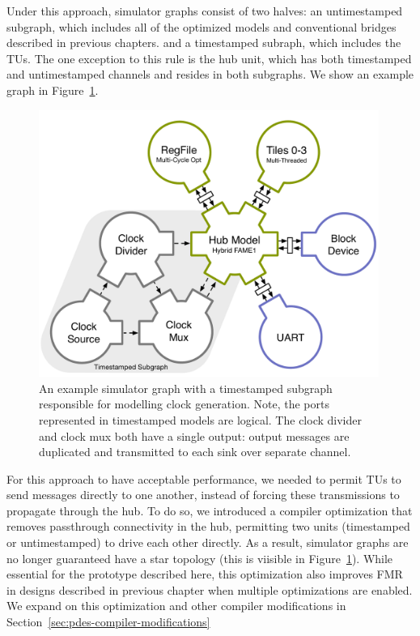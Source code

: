 Under this approach, simulator graphs consist of two halves: an untimestamped
subgraph, which includes all of the optimized models and conventional bridges
described in previous chapters. and a timestamped subraph, which includes the
TUs.  The one exception to this rule is the hub unit, which has both
timestamped and untimestamped  channels and resides in both subgraphs. We show
an example graph in Figure~\ref{fig:gg-graph-pdes}.

\begin{figure}
    \centering
    \includegraphics[width=0.99\textwidth]{figures/gg-graph-pdes.pdf}
    \caption{An example simulator graph with a timestamped subgraph
    responsible for modelling clock generation.  Note, the ports represented in
    timestamped models are logical. The clock divider and clock mux both have a
    single output: output messages are duplicated and transmitted to each sink
    over separate channel.}
    \label{fig:gg-graph-pdes}
\end{figure}

For this approach to have acceptable performance, we needed to permit TUs to
send messages directly to one another, instead of forcing these transmissions
to propagate through the hub.  To do so, we introduced a compiler optimization
that removes passthrough connectivity in the hub, permitting two units
(timestamped or untimestamped) to drive each other directly. As a result,
simulator graphs are no longer guaranteed have a star topology (this is
viisible in Figure~\ref{fig:gg-graph-pdes}).  While essential for the prototype
described here, this optimization also improves FMR in designs described in
previous chapter when multiple optimizations are enabled. We expand on this
optimization and other compiler modifications in Section~\ref{sec:pdes-compiler-modifications}

